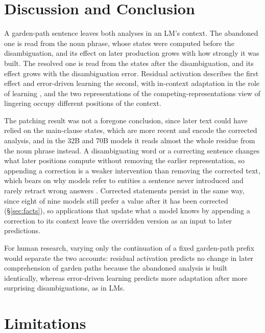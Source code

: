 \documentclass[11pt]{article}
\begin{document}
\section{Discussion and Conclusion}

A garden-path sentence leaves both analyses in an LM's context.
The abandoned one is read from the noun phrase, whose states were computed before the disambiguation, and its effect on later production grows with how strongly it was built.
The resolved one is read from the states after the disambiguation, and its effect grows with the disambiguation error.
Residual activation describes the first effect and error-driven learning the second, with in-context adaptation in the role of learning \citep{zhou2025icl}, and the two representations of the competing-representations view of lingering \citep{slattery2013} occupy different positions of the context.

The patching result was not a foregone conclusion, since later text could have relied on the main-clause states, which are more recent and encode the corrected analysis, and in the 32B and 70B models it reads almost the whole residue from the noun phrase instead.
A disambiguating word or a correcting sentence changes what later positions compute without removing the earlier representation, so appending a correction is a weaker intervention than removing the corrected text, which bears on why models refer to entities a sentence never introduced \citep{schuster2022} and rarely retract wrong answers \citep{yang2025retraction}.
Corrected statements persist in the same way, since eight of nine models still prefer a value after it has been corrected (\S\ref{sec:facts}), so applications that update what a model knows by appending a correction to its context leave the overridden version as an input to later predictions.

For human research, varying only the continuation of a fixed garden-path prefix would separate the two accounts: residual activation predicts no change in later comprehension of garden paths because the abandoned analysis is built identically, whereas error-driven learning predicts more adaptation after more surprising disambiguations, as in LMs.

\section*{Limitations}
\end{document}
